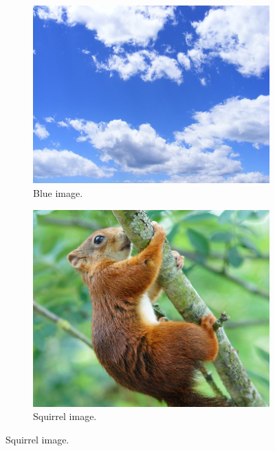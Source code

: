 \documentclass[abstracton]{scrreprt}
\begin{document}
            \begin{figure}[!ht]
                \centering
                \begin{subfigure}[b]{0.245\textwidth}
                    \includegraphics[width=\textwidth]{img/images/blue.png}
                    \caption{Blue image.}
                \end{subfigure}
                \begin{subfigure}[b]{0.22\textwidth}
                    \includegraphics[width=\textwidth]{img/images/squirrel.png}
                    \caption{Squirrel image.}
                \end{subfigure}

\end{figure}
\end{document}
